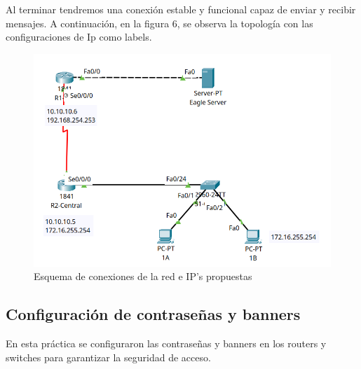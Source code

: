 \documentclass[a4paper,11pt]{article}
\begin{document}
Al terminar tendremos una conexión estable y funcional capaz de enviar y
recibir mensajes. A continuación, en la figura 6, se observa la topología con
las configuraciones de Ip como labels.

\begin{figure}[h]
    \includegraphics[width=1 \textwidth]{images/config_diagram.png}
    \caption{Esquema de conexiones de la red e IP's propuestas}
\end{figure}

\newpage

\subsection{Configuración de contraseñas y banners}

En esta práctica se configuraron las contraseñas y banners en los routers y
switches para garantizar la seguridad de acceso.
\end{document}
